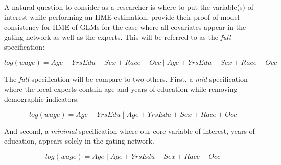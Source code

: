 \documentclass[12pt]{article}
\theoremstyle{definition}
\begin{document}
\bigskip

A natural question to consider as a researcher is where to put the variable(s) of interest while performing an HME estimation. \citet{JiangTanner2000} provide their proof of model consistency for HME of GLMs for the case where all covariates appear in the gating network as well as the experts. This will be referred to as the \textit{full} specification:

\begin{equation} \label{eq:full_formula}
  log(wage) = Age + YrsEdu + Sex +  Race + Occ \; | \; Age + YrsEdu + Sex +  Race + Occ
\end{equation}

The \textit{full} specification will be compare to two others. First, a \textit{mid} specification where the local experts contain age and years of education while removing demographic indicators:

\begin{equation} \label{eq:mid_formula}
  log(wage) = Age + YrsEdu \; | \; Age + YrsEdu + Sex +  Race + Occ
\end{equation}

And second, a \textit{minimal} specification where our core variable of interest, years of education, appears solely in the gating network.

\begin{equation} \label{eq:min_formula}
  log(wage) = Age \; | \; Age + YrsEdu + Sex +  Race + Occ
\end{equation}
\end{document}
